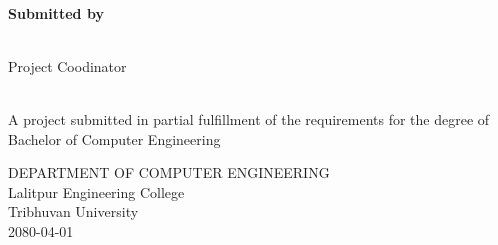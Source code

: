 \begin{center}
    \linespread{1.6}
    \thispagestyle{empty}
    \textbf{\large{\thetitle}} \\
    \vspace{2cm}

    \textbf{Submitted by} \\
    {\theauthor} \\

    \vspace{2cm}

    Project Coodinator\\
    {\thesupervisor} \\

    \vspace{2.2cm}

    A project submitted in partial fulfillment of the requirements for the degree of\\
    Bachelor of Computer Engineering

    \vspace{2.2cm}

    DEPARTMENT OF COMPUTER ENGINEERING \\
    Lalitpur Engineering College\\
    Tribhuvan University\\
    \vspace{1.3 in}
    2080-04-01

\end{center}
